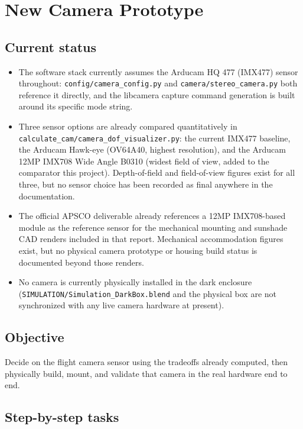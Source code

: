 \chapter{New Camera Prototype}
\label{chap:camera-prototype}

\section{Current status}

\begin{itemize}
    \item The software stack currently assumes the Arducam HQ 477 (IMX477) sensor throughout: \texttt{config/camera\_config.py} and \texttt{camera/stereo\_camera.py} both reference it directly, and the libcamera capture command generation is built around its specific mode string.
    \item Three sensor options are already compared quantitatively in \texttt{calculate\_cam/camera\_dof\_visualizer.py}: the current IMX477 baseline, the Arducam Hawk-eye (OV64A40, highest resolution), and the Arducam 12MP IMX708 Wide Angle B0310 (widest field of view, added to the comparator this project). Depth-of-field and field-of-view figures exist for all three, but no sensor choice has been recorded as final anywhere in the documentation.
    \item The official APSCO deliverable already references a 12MP IMX708-based module as the reference sensor for the mechanical mounting and sunshade CAD renders included in that report. Mechanical accommodation figures exist, but no physical camera prototype or housing build status is documented beyond those renders.
    \item No camera is currently physically installed in the dark enclosure (\texttt{SIMULATION/Simulation\_DarkBox.blend} and the physical box are not synchronized with any live camera hardware at present).
\end{itemize}

\section{Objective}

Decide on the flight camera sensor using the tradeoffs already computed, then physically build, mount, and validate that camera in the real hardware end to end.

\section{Step-by-step tasks}

